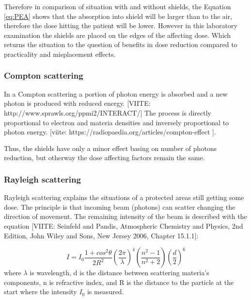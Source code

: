 \documentclass[fleqn,10pt]{SelfArx} %
\begin{document}
Therefore in comparison of situation with and without shields, the Equation \ref{eq:PEA} shows that the absorption into shield will be larger than to the air, therefore the dose hitting the patient will be lower. However in this laboratory examination the shields are placed on the edges of the affecting dose. Which returns the situation to the question of benefits in dose reduction compared to practicality and misplacement effects.

\subsubsection{Compton scattering}
In a Compton scattering a portion of photon energy is absorbed and a new photon is produced with reduced energy. [VIITE: http://www.sprawls.org/ppmi2/INTERACT/]  The process is directly proportional to electron and materia densities and inversely proportional to photon energy. [viite: https://radiopaedia.org/articles/compton-effect ].

Thus, the shields have only a minor effect basing on number of photons reduction, but otherway the dose affecting factors remain the same.


\subsubsection{Rayleigh scattering}

Rayleigh scattering explains the situations of a protected areas still getting some dose. The principle is that incoming beam (photons) can scatter changing the direction of movement. The remaining intensity of the beam is described with the equation [VIITE: Seinfeld and Pandis, Atmospheric Chemistry and Physics, 2nd Edition, John Wiley and Sons, New Jersey 2006, Chapter 15.1.1]:

\begin{equation}
I=I_0 \frac{1+cos^2 \theta}{2R^2} \left( \frac{2 \pi}{\lambda} \right)^4 \left( \frac{n^2 -1}{n^2 +2} \right) \left(\frac{d}{2} \right)^6
\end{equation}
where $\lambda$ is wavelength, d is the distance between scattering materia's components, n is refractive index, and R is the distance to the particle at the start where the intensity $I_0$ is measured.


\end{document}
